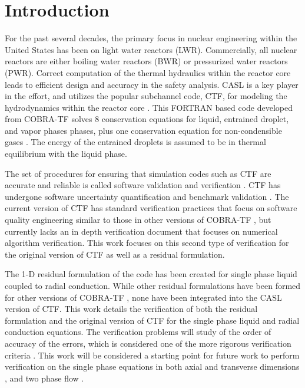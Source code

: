 \vspace*{-80mm}
\chapter{Introduction} \label{chapter1:introduction}

For the past several decades, the primary focus in nuclear engineering within
the United States has been on light water reactors (LWR). Commercially,
all nuclear reactors are either boiling water reactors (BWR) or pressurized
water reactors (PWR). Correct computation of the thermal hydraulics within the
reactor core leads to efficient design and accuracy in the safety analysis. 
CASL is a key player in the effort, and utilizes the popular subchannel code,
CTF, for modeling the hydrodynamics within the reactor core \cite{Schmidt2014}.
This FORTRAN based code developed from COBRA-TF solves 8 conservation equations
for liquid, entrained droplet, and vapor phases phases, plus one conservation
equation for non-condensible gases \cite{CTF_theory}. The energy of the
entrained droplets is assumed to be in thermal equilibrium with the liquid
phase.

The set of procedures for ensuring that simulation codes such as CTF are
accurate and reliable is called software validation and verification
\cite{Oberkampf2008}. CTF has undergone software uncertainty quantification and
benchmark validation \cite{Avramova2015}. The current version of CTF has
standard verification practices that focus on software quality engineering
similar to those in other versions of COBRA-TF \cite{Aumiller2013}, but
currently lacks an in depth verification document that focuses on numerical
algorithm verification. This work focuses on this second type of verification
for the original version of CTF as well as a residual formulation. 

The 1-D residual formulation of the code has been created for single phase
liquid coupled to radial conduction. While other residual formulations have been
formed for other versions of COBRA-TF \cite{Lloyd2014}, none have been
integrated into the CASL version of CTF. This work details the verification of
both the residual formulation and the original version of CTF for the single
phase liquid and radial conduction equations. The verification problems will
study of the order of accuracy of the errors, which is considered one of the
more rigorous verification criteria \cite{Roy2005}. This work will be
considered a starting point for future work to perform verification on the
single phase equations in both axial and transverse dimensions
\cite{Merroun2009}, and two phase flow \cite{Mahadevan2009}.

